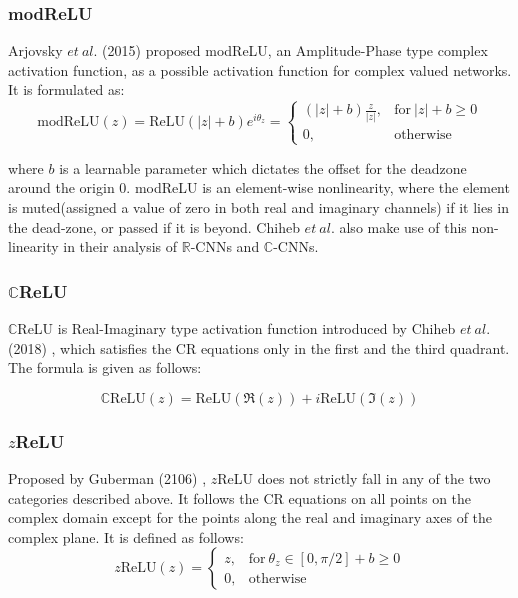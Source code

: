  
 
 

 \subsubsection{modReLU}
Arjovsky $et \ al.$ (2015) \cite{ArjovskySB15} proposed modReLU, an Amplitude-Phase type complex activation function, as a possible activation function for complex valued networks. It is formulated as:
 \begin{equation}
\mathrm{modReLU}(z) = \mathrm{ReLU}(|z| + b)e^{i\theta_{z}}
{}=\begin{cases} (|z| + b)\frac{z}{|z|} , &\mathrm{for} \ |z| + b\ge 0 \\ 0 , &\textrm{otherwise} \end{cases}
\end{equation}

where $b$ is a learnable parameter which dictates the offset for the deadzone around the origin $0$. modReLU is an element-wise nonlinearity, where the element is muted(assigned a value of zero in both real and imaginary channels) if it lies in the dead-zone, or passed if it is beyond. Chiheb $et \ al.$ \cite{trabelsi2018deep} also make use of this non-linearity in their analysis of $\mathbb{R}$-CNNs and $\mathbb{C}$-CNNs.


\subsubsection{$\mathbb{C}$ReLU}
$\mathbb{C}$ReLU is Real-Imaginary type activation function introduced by Chiheb $et \ al.$ (2018) \cite{trabelsi2018deep}, which satisfies the CR equations only in the first and the third quadrant. The formula is given as follows:

\begin{equation}
\label{eqcrelu}
\mathbb{C}\mathrm{ReLU}(z) = \mathrm{ReLU}(\Re(z))+i\mathrm{ReLU}(\Im(z))
\end{equation}

 
 
 \subsubsection{$z$ReLU}
 Proposed by Guberman (2106) \cite{Guberman}, $z$ReLU does not strictly fall in any of the two categories described above. It follows the CR equations on all points on the complex domain except for the points along the real and imaginary axes of the complex plane. It is defined as follows:
  \begin{equation}
  \label{eqzrelu}
 z\mathrm{ReLU}(z) 
 {}=\begin{cases} z , &\mathrm{for} \ \theta_{z} \in [0,\pi/2] + b\ge 0 \\ 0 , &\textrm{otherwise} \end{cases}
 \end{equation}

